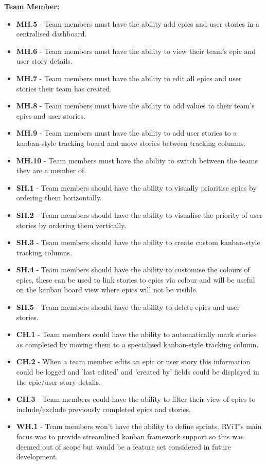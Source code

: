\documentclass[l4proj.tex]{subfiles}
\begin{document}
\textbf{Team Member:}
\begin{itemize}
     \item \textbf{MH.5} - Team members must have the ability add epics and user stories in a centralised dashboard. 
     \item \textbf{MH.6} - Team members must have the ability to view their team's epic and user story details. 
     \item \textbf{MH.7} - Team members must have the ability to edit all epics and user stories their team has created. 
     \item \textbf{MH.8} - Team members must have the ability to add values to their team's epics and user stories. 
     \item \textbf{MH.9} - Team members must have the ability to add user stories to a kanban-style tracking board and move stories between tracking columns.
     \item \textbf{MH.10} - Team members must have the ability to switch between the teams they are a member of. \\

    \item \textbf{SH.1} - Team members should have the ability to visually prioritise epics by ordering them horizontally. 
    \item \textbf{SH.2} - Team members should have the ability to visualise the priority of user stories by ordering them vertically. 
    \item \textbf{SH.3} - Team members should have the ability to create custom kanban-style tracking columns.
    \item \textbf{SH.4} - Team members should have the ability to customise the colours of epics, these can be used to link stories to epics via colour and will be useful on the kanban board view where epics will not be visible.
    \item \textbf{SH.5} - Team members should have the ability to delete epics and user stories.\\

    \item \textbf{CH.1} - Team members could have the ability to automatically mark stories as completed by moving them to a specialised kanban-style tracking column.
    \item \textbf{CH.2} - When a team member edits an epic or user story this information could be logged and 'last edited' and 'created by' fields could be displayed in the epic/user story details.
    \item \textbf{CH.3} - Team members could have the ability to filter their view of epics to include/exclude previously completed epics and stories. \\

    \item \textbf{WH.1} - Team members won't have the ability to define sprints. RViT's main focus was to provide streamlined kanban framework support so this was deemed out of scope but would be a feature set considered in future development.\\
\end{itemize}
\hfill
\end{document}
